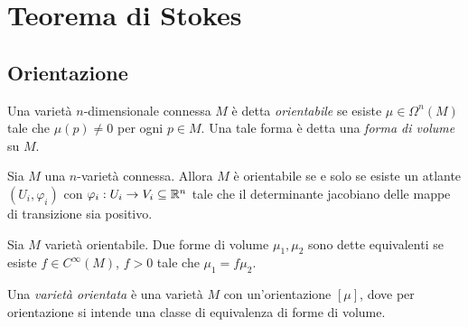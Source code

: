 \chapter{Teorema di Stokes}




\section{Orientazione}

\begin{definition}  
	Una varietà $n$-dimensionale connessa $M$ è detta \emph{orientabile} se esiste $\mu\in\Omega^n(M)$ tale che $\mu(p)\not=0$ per ogni $p\in M$. Una tale forma è detta una \emph{forma di volume} su $M$.
\end{definition}

\begin{proposition}
	Sia $M$ una $n$-varietà connessa. Allora $M$ è orientabile se e solo se esiste un atlante $(U_i,\varphi_i)$ con $\varphi_i:U_i\to V_i\subseteq \mathbb R^n$ tale che il determinante jacobiano delle mappe di transizione sia positivo.
\end{proposition}

\begin{definition} 
	Sia $M$ varietà orientabile. Due forme di volume $\mu_1,\mu_2$ sono dette equivalenti se esiste $f\in C^\infty(M)$, $f>0$ tale che $\mu_1= f \mu_2$.
	
	Una \emph{varietà orientata} è una varietà $M$ con un'orientazione $[\mu]$, dove per orientazione si intende una classe di equivalenza di forme di volume.
\end{definition}

